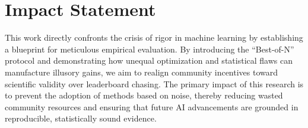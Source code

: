 \section*{Impact Statement}

This work directly confronts the crisis of rigor in machine learning by establishing a blueprint for meticulous empirical evaluation. By introducing the ``Best-of-N'' protocol and demonstrating how unequal optimization and statistical flaws can manufacture illusory gains, we aim to realign community incentives toward scientific validity over leaderboard chasing. The primary impact of this research is to prevent the adoption of methods based on noise, thereby reducing wasted community resources and ensuring that future AI advancements are grounded in reproducible, statistically sound evidence.